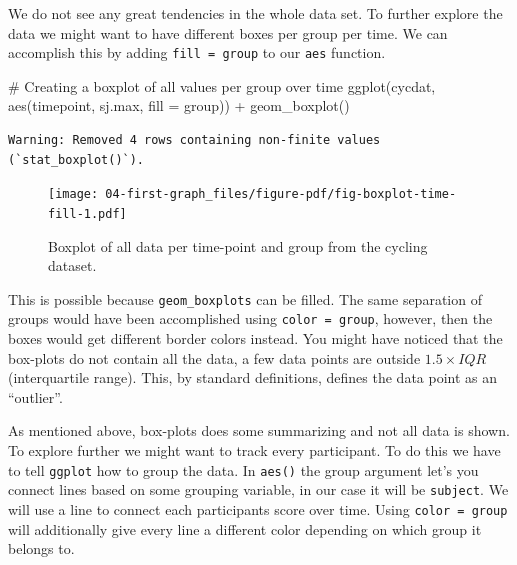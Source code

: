 \documentclass[
  11pt,
  letterpaper,
]{scrbook}
\newenvironment{Shaded}{\begin{snugshade}}{\end{snugshade}}
\newcommand{\AttributeTok}[1]{\textcolor[rgb]{0.40,0.45,0.13}{#1}}
\newcommand{\CommentTok}[1]{\textcolor[rgb]{0.37,0.37,0.37}{#1}}
\newcommand{\FunctionTok}[1]{\textcolor[rgb]{0.28,0.35,0.67}{#1}}
\newcommand{\NormalTok}[1]{\textcolor[rgb]{0.00,0.23,0.31}{#1}}
\newcommand{\SpecialCharTok}[1]{\textcolor[rgb]{0.37,0.37,0.37}{#1}}
\begin{document}
We do not see any great tendencies in the whole data set. To further
explore the data we might want to have different boxes per group per
time. We can accomplish this by adding \texttt{fill\ =\ group} to our
\texttt{aes} function.

\begin{Shaded}
\begin{Highlighting}[numbers=left,,]
\CommentTok{\# Creating a boxplot of all values per group over time}
\FunctionTok{ggplot}\NormalTok{(cycdat, }\FunctionTok{aes}\NormalTok{(timepoint, sj.max, }\AttributeTok{fill =}\NormalTok{ group)) }\SpecialCharTok{+} \FunctionTok{geom\_boxplot}\NormalTok{()}
\end{Highlighting}
\end{Shaded}

\begin{verbatim}
Warning: Removed 4 rows containing non-finite values (`stat_boxplot()`).
\end{verbatim}

\begin{figure}[H]

{\centering \texttt{[image: 04-first-graph\_files/figure-pdf/fig-boxplot-time-fill-1.pdf]}

}

\caption{\label{fig-boxplot-time-fill}Boxplot of all data per time-point
and group from the cycling dataset.}

\end{figure}

This is possible because \texttt{geom\_boxplots} can be filled. The same
separation of groups would have been accomplished using
\texttt{color\ =\ group}, however, then the boxes would get different
border colors instead. You might have noticed that the box-plots do not
contain all the data, a few data points are outside \(1.5 \times IQR\)
(interquartile range). This, by standard definitions, defines the data
point as an ``outlier''.

As mentioned above, box-plots does some summarizing and not all data is
shown. To explore further we might want to track every participant. To
do this we have to tell \texttt{ggplot} how to group the data. In
\texttt{aes()} the group argument let's you connect lines based on some
grouping variable, in our case it will be \texttt{subject}. We will use
a line to connect each participants score over time. Using
\texttt{color\ =\ group} will additionally give every line a different
color depending on which group it belongs to.
\end{document}

